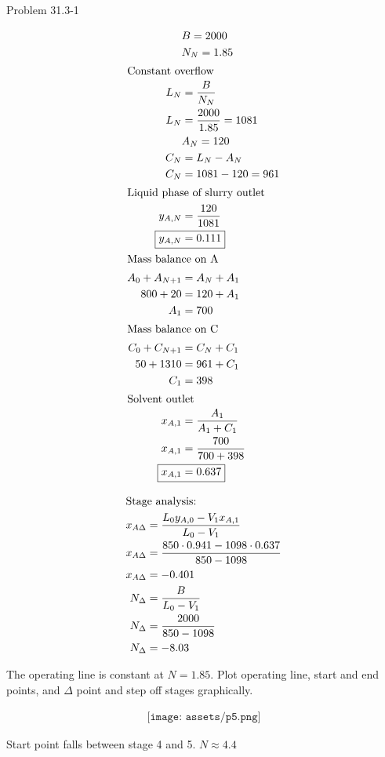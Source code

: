 \item Problem 31.3-1

\begin{align*}
    & B = 2000 \\
    & N_N = 1.85 \\
    \intertext{Constant overflow}
    L_N &= \frac{B}{N_N} \\
    L_N &= \frac{2000}{1.85} = 1081 \\
    & A_N = 120 \\
    C_N &= L_N - A_N \\
    C_N &= 1081 - 120 = 961 \\
    \intertext{Liquid phase of slurry outlet}
    y_{A,N} &= \frac{120}{1081} \\
    \Aboxed{y_{A,N} &= 0.111} \\
    \intertext{Mass balance on A}
    A_0 + A_{N+1} &= A_N + A_1 \\
    800 + 20 &= 120 + A_1 \\
    A_1 &= 700 \\
    \intertext{Mass balance on C}
    C_0 + C_{N+1} &= C_N + C_1 \\
    50 + 1310 &= 961 + C_1 \\
    C_1 &= 398 \\
    \intertext{Solvent outlet}
    x_{A,1} &= \frac{A_1}{A_1 + C_1} \\
    x_{A,1} &= \frac{700}{700 + 398} \\
    \Aboxed{x_{A,1} &= 0.637}
\end{align*}

\begin{align*}
    \intertext{Stage analysis:}
    x_{A\Delta} &= \frac{L_0 y_{A,0} - V_1 x_{A,1}}{L_0 - V_1} \\
    x_{A\Delta} &= \frac{850 \cdot 0.941 - 1098 \cdot 0.637}{850 - 1098} \\
    x_{A\Delta} &= -0.401 \\
    N_\Delta &= \frac{B}{L_0 - V_1} \\
    N_\Delta &= \frac{2000}{850 - 1098} \\
    N_\Delta &= -8.03 \\
\end{align*}

The operating line is constant at $N=1.85$. Plot operating line, start and end points, and $\Delta$ point and step off stages graphically.

\begin{align*}
    \texttt{[image: assets/p5.png]}
\end{align*}

Start point falls between stage 4 and 5. $\boxed{N \approx 4.4}$